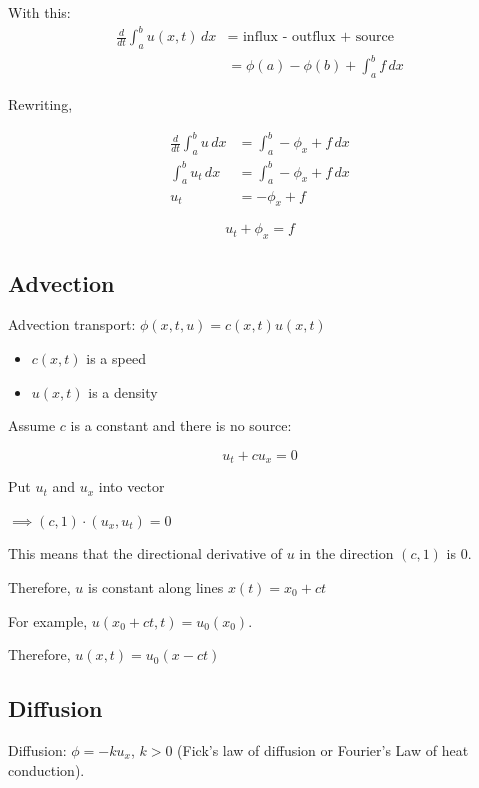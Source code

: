 \documentclass[main.tex]{subfiles}
\begin{document}
With this:
\begin{align}
\frac{d}{dt} \int_a^b u(x,t)\,dx &= \textrm{ influx - outflux + source} \\
                                 &= \phi(a) - \phi(b) + \int_a^b f\,dx
\end{align}

Rewriting,

\begin{align}
\frac{d}{dt}\int_a^bu\,dx &= \int_a^b -\phi_x + f\,dx \\
\int_a^b u_t\,dx          &= \int_a^b -\phi_x + f\,dx \\
u_t &= -\phi_x + f
\end{align}

\begin{equation}
\label{eq:conservation-law}
u_t + \phi_x = f
\end{equation}

\subsection{Advection}
Advection transport: $\phi(x, t, u) = c(x, t)u(x, t)$
\begin{itemize}
    \item $c(x, t)$ is a speed
    \item $u(x, t)$ is a density
\end{itemize}

Assume $c$ is a constant and there is no source:

\begin{equation}
\label{eq:advection}
u_t + cu_x = 0
\end{equation}

Put $u_t$ and $u_x$ into vector

$\implies (c, 1) \cdot (u_x, u_t) = 0$

This means that the directional derivative of $u$ in the direction $(c, 1)$ is 0.

Therefore, $u$ is constant along lines $x(t) = x_0 + ct$

For example, $u(x_0+ct, t) = u_0(x_0)$.

Therefore, $u(x, t) = u_0(x-ct)$

\subsection{Diffusion}

Diffusion: $\phi = -ku_x$, $k > 0$ (Fick's law of diffusion or Fourier's Law of heat conduction).
\end{document}
